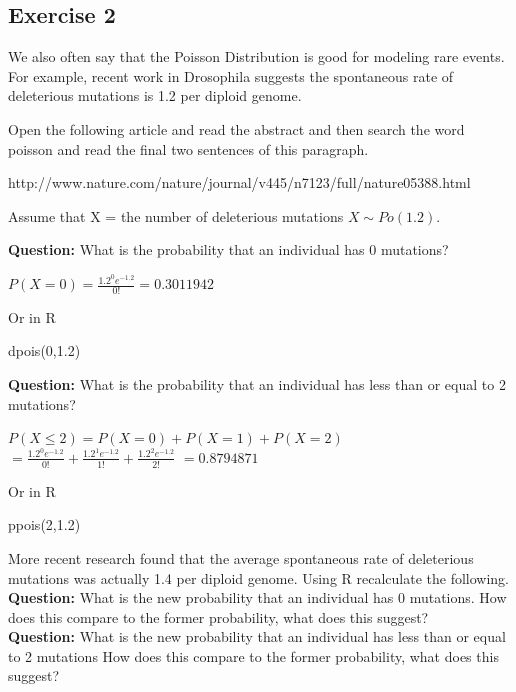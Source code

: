 \documentclass[
  10pt,
  letterpaper,
  DIV=11,
  numbers=noendperiod]{scrartcl}
\newenvironment{Shaded}{\begin{snugshade}}{\end{snugshade}}
\newcommand{\DecValTok}[1]{\textcolor[rgb]{0.68,0.00,0.00}{#1}}
\newcommand{\FloatTok}[1]{\textcolor[rgb]{0.68,0.00,0.00}{#1}}
\newcommand{\FunctionTok}[1]{\textcolor[rgb]{0.28,0.35,0.67}{#1}}
\newcommand{\NormalTok}[1]{\textcolor[rgb]{0.00,0.23,0.31}{#1}}
\begin{document}
\hypertarget{exercise-2-1}{%
\subsection{Exercise 2}\label{exercise-2-1}}

We also often say that the Poisson Distribution is good for modeling
rare events. For example, recent work in Drosophila suggests the
spontaneous rate of deleterious mutations is 1.2 per diploid genome.

Open the following article and read the abstract and then search the
word poisson and read the final two sentences of this paragraph.

http://www.nature.com/nature/journal/v445/n7123/full/nature05388.html

Assume that X = the number of deleterious mutations \(X \sim Po(1.2)\).

\textbf{Question:} What is the probability that an individual has 0
mutations?

\(P(X=0)=\frac{1.2^0e^{-1.2}}{0!}=0.3011942\)

Or in R

\begin{Shaded}
\begin{Highlighting}[]
\FunctionTok{dpois}\NormalTok{(}\DecValTok{0}\NormalTok{,}\FloatTok{1.2}\NormalTok{)}
\end{Highlighting}
\end{Shaded}

\textbf{Question:} What is the probability that an individual has less
than or equal to 2 mutations?

\(P(X\le2)=P(X=0)+P(X=1)+P(X=2)\)
\(=\frac{1.2^0e^{-1.2}}{0!}+\frac{1.2^1e^{-1.2}}{1!}+\frac{1.2^2e^{-1.2}}{2!}\)
\(=0.8794871\)

Or in R

\begin{Shaded}
\begin{Highlighting}[]
\FunctionTok{ppois}\NormalTok{(}\DecValTok{2}\NormalTok{,}\FloatTok{1.2}\NormalTok{)}
\end{Highlighting}
\end{Shaded}

More recent research found that the average spontaneous rate of
deleterious mutations was actually 1.4 per diploid genome. Using R
recalculate the following.\\

\textbf{Question:} What is the new probability that an individual has 0
mutations. How does this compare to the former probability, what does
this suggest?\\
\textbf{Question:} What is the new probability that an individual has
less than or equal to 2 mutations How does this compare to the former
probability, what does this suggest?\\
\end{document}
